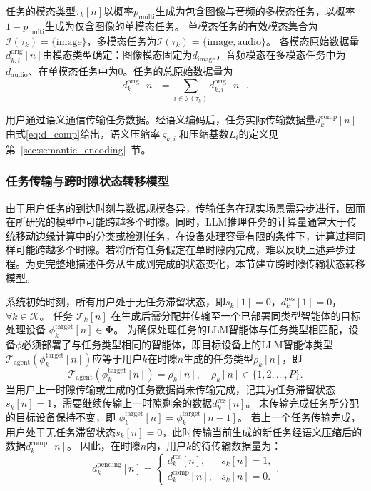 任务的模态类型$\tau_k[n]$以概率$p_{\text{multi}}$生成为包含图像与音频的多模态任务，以概率$1-p_{\text{multi}}$生成为仅含图像的单模态任务。
单模态任务的有效模态集合为$\mathcal{I}(\tau_k)=\{\text{image}\}$，多模态任务为$\mathcal{I}(\tau_k)=\{\text{image},\text{audio}\}$。
各模态原始数据量$d_{k,i}^{\text{orig}}[n]$由模态类型确定：图像模态固定为$d_{\text{image}}$，音频模态在多模态任务中为$d_{\text{audio}}$、在单模态任务中为$0$。任务的总原始数据量为
\begin{equation}
d_k^{\text{orig}}[n] = \sum_{i\in\mathcal{I}(\tau_k)} d_{k,i}^{\text{orig}}[n].
\end{equation}

用户通过语义通信传输任务数据。经语义编码后，任务实际传输数据量$d_k^{\text{comp}}[n]$由式\eqref{eq:d_comp}给出，语义压缩率$\varsigma_{k,i}$和压缩基数$L_i$的定义见第~\ref{sec:semantic_encoding}~节。


\subsubsection{任务传输与跨时隙状态转移模型}
由于用户任务的到达时刻与数据规模各异，传输任务在现实场景需异步进行，因而在所研究的模型中可能跨越多个时隙。同时，LLM推理任务的计算量通常大于传统移动边缘计算中的分类或检测任务，在设备处理容量有限的条件下，计算过程同样可能跨越多个时隙。若将所有任务假定在单时隙内完成，难以反映上述异步过程。为更完整地描述任务从生成到完成的状态变化，本节建立跨时隙传输状态转移模型。

系统初始时刻，所有用户处于无任务滞留状态，即$s_k[1]=0$，$d_k^{\text{res}}[1]=0$，$\forall k\in\mathcal{K}$。
任务 $\mathcal{T}_{k}[n]$ 在生成后需分配并传输至一个已部署同类型智能体的目标处理设备 $\phi_{k}^{\text{target}}[n]\in\boldsymbol{\Phi}$。
为确保处理任务的LLM智能体与任务类型相匹配，设备$\phi$必须部署了与任务类型相同的智能体，即目标设备上的LLM智能体类型$\mathcal{T}_{\text{agent}}(\phi_{k}^{\text{target}}[n])$应等于用户$k$在时隙$n$生成的任务类型$\rho_k[n]$，即
\begin{equation}
\mathcal{T}_{\text{agent}}(\phi_{k}^{\text{target}}[n]) = \rho_k[n], \quad \rho_k[n] \in \{1,2,\ldots,P\}.
\end{equation}
当用户上一时隙传输或生成的任务数据尚未传输完成，记其为任务滞留状态$s_{k}[n]=1$，需要继续传输上一时隙剩余的数据$d_{k}^{\text{res}}[n]$。
未传输完成任务所分配的目标设备保持不变，即 $\phi_{k}^{\text{target}}[n]=\phi_{k}^{\text{target}}[n-1]$。
若上一个任务传输完成，用户处于无任务滞留状态$s_{k}[n]=0$，此时传输当前生成的新任务经语义压缩后的数据$d_{k}^{\text{comp}}[n]$。
因此，在时隙$n$内，用户$k$的待传输数据量为：
\begin{equation}
d_{k}^{\text{pending}}[n]=
\begin{cases}
d_{k}^{\text{res}}[n], & s_{k}[n]=1,\\[3pt]
d_{k}^{\text{comp}}[n], & s_{k}[n]=0.
\end{cases}.
\end{equation}

